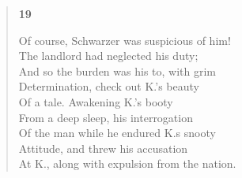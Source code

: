 \documentclass{article}
\begin{document}
\begin{verse}
  \begin{center}
    \textbf{19} \\
  \end{center}
  Of course, Schwarzer was suspicious of him! \\
  The landlord had neglected his duty; \\
  And so the burden was his to, with grim \\
  Determination, check out K.'s beauty \\
  Of a tale. Awakening K.'s booty \\
  From a deep sleep, his interrogation \\
  Of the man while he endured K.s snooty \\
  Attitude, and threw his accusation \\
  At K., along with expulsion from the nation.

\end{verse}
\end{document}
